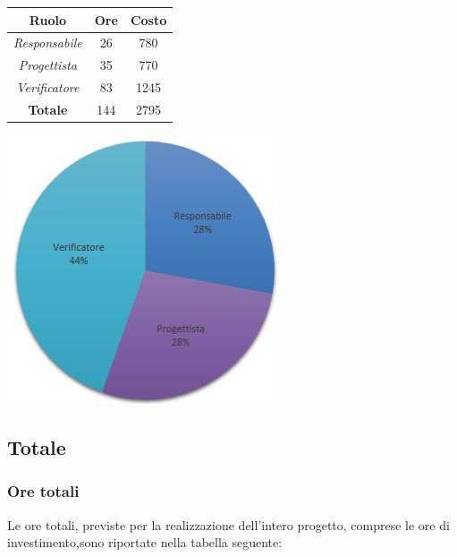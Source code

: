 \begin{center}
  \centering
  \begin{tabular}{|c|c|c|}
    \hline
    \textbf{Ruolo} & \textbf{Ore} & \textbf{Costo} \\
    \hline
     \emph{Responsabile}  & 26 & 780 \\
    \hline  \emph{Progettista}  & 35 & 770 \\
    \hline  \emph{Verificatore}  & 83 & 1245 \\
    \hline
    \textbf{Totale} & 144 & 2795 \\
    \hline
  \end{tabular}
  \includegraphics[scale=0.7]{img/6-Validazione.png}
\end{center}

\subsection{Totale}
\subsubsection{Ore totali}
Le ore totali, previste per la realizzazione dell’intero progetto, comprese le ore di investimento,sono riportate nella tabella seguente: \\ \\

